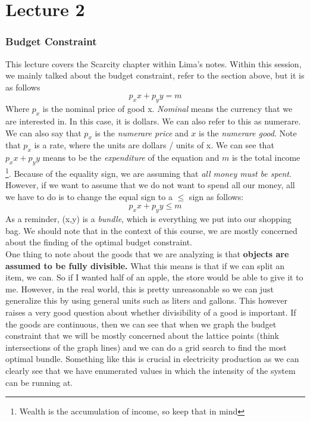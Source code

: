 \documentclass{article}
\begin{document}
\section{Lecture 2}
\subsubsection{Budget Constraint}
This lecture covers the Scarcity chapter within Lima's notes. Within this session, we mainly talked about the budget constraint, refer to the section above, but it is as follows
\[
p_xx + p_yy = m
\]
Where $p_x$ is the nominal price of good x. \textit{Nominal} means the currency that we are interested in. In this case, it is dollars. We can also refer to this as numerare. We can also say that $p_x$ is the \textit{numerare price} and $x$ is the \textit{numerare good}. Note that $p_x$ is a rate, where the units are dollars / units of x. We can see that \(p_xx + p_yy\) means to be the \textit{expenditure} of the equation and $m$ is the total income \footnote{Wealth is the accumulation of income, so keep that in mind}. Because of the equality sign, we are assuming that \textit{all money must be spent}. However, if we want to assume that we do not want to spend all our money, all we have to do is to change the equal sign to a $\leq$ sign as follows:
\[
p_xx + p_yy \leq m
\]
As a reminder, (x,y) is a \textit{bundle}, which is everything we put into our shopping bag. We should note that in the context of this course, we are mostly concerned about the finding of the optimal budget constraint.\\


One thing to note about the goods that we are analyzing is that \textbf{objects are assumed to be fully divisible.} What this means is that if we can split an item, we can. So if I wanted half of an apple, the store would be able to give it to me. However, in the real world, this is pretty unreasonable so we can just generalize this by using general units such as liters and gallons. This however raises a very good question about whether divisibility of a good is important. If the goods are continuous, then we can see that when we graph the budget constraint that we will be mostly concerned about the lattice points (think intersections of the graph lines) and we can do a grid search to find the most optimal bundle. Something like this is crucial in electricity production as we can clearly see that we have enumerated values in which the intensity of the system can be running at. \\
\end{document}

